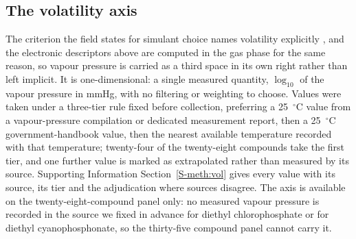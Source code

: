 \documentclass[journal=ancham,manuscript=article,margin=1in]{achemso}
\begin{document}
\subsection{The volatility axis}
\label{meth:vol}
The criterion the field states for simulant choice names volatility explicitly
\cite{webb2025}, and the electronic descriptors above are computed in the gas
phase for the same reason, so vapour pressure is carried as a third space in its
own right rather than left implicit. It is one-dimensional: a single measured
quantity, $\log_{10}$ of the vapour pressure in mmHg, with no filtering or
weighting to choose. Values were taken under a three-tier rule fixed before collection, preferring a
25~$^{\circ}$C value from a vapour-pressure compilation or dedicated measurement
report, then a 25~$^{\circ}$C government-handbook value, then the nearest
available temperature recorded with that temperature; twenty-four of the
twenty-eight compounds take the first tier, and one further value is marked as
extrapolated rather than measured by its source. Supporting Information
Section~\ref{S-meth:vol} gives every value with its source, its tier and the
adjudication where sources disagree. The axis is available on the
twenty-eight-compound panel only: no measured vapour pressure is recorded in
the source we fixed in advance for
diethyl chlorophosphate or for diethyl cyanophosphonate, so the thirty-five
compound panel cannot carry it.
\end{document}
